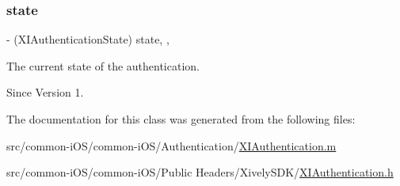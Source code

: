 \subsubsection{\texorpdfstring{state}{state}}
{\footnotesize\ttfamily -\/ (X\+I\+Authentication\+State) state\hspace{0.3cm}{\ttfamily [read]}, {\ttfamily [nonatomic]}, {\ttfamily [assign]}}



The current state of the authentication. 

\begin{DoxySince}{Since}
Version 1. 
\end{DoxySince}


The documentation for this class was generated from the following files\+:\begin{DoxyCompactItemize}
\item 
src/common-\/i\+O\+S/common-\/i\+O\+S/\+Authentication/\hyperlink{_x_i_authentication_8m}{X\+I\+Authentication.\+m}\item 
src/common-\/i\+O\+S/common-\/i\+O\+S/\+Public Headers/\+Xively\+S\+D\+K/\hyperlink{_x_i_authentication_8h}{X\+I\+Authentication.\+h}\end{DoxyCompactItemize}
